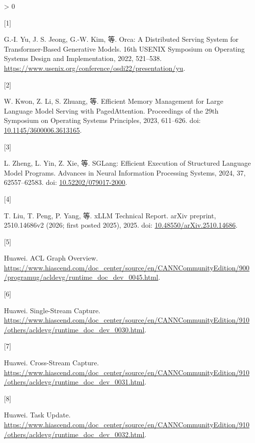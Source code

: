 \documentclass[
  UTF8,
  zihao=5]{ctexart}
\newlength{\cslhangindent}
\newlength{\csllabelwidth}
\newenvironment{CSLReferences}[2] %
 {%
  \setlength{\parindent}{0pt}
  \ifodd #1 \everypar{\setlength{\hangindent}{\cslhangindent}}\ignorespaces\fi
  \ifnum #2 > 0
  \setlength{\parskip}{#2\baselineskip}
  \fi
 }%
 {}
\newcommand{\CSLLeftMargin}[1]{\parbox[t]{\csllabelwidth}{#1}}
\newcommand{\CSLRightInline}[1]{\parbox[t]{\linewidth - \csllabelwidth}{#1}\par}
\begin{document}
\hypertarget{refs}{}
\begin{CSLReferences}{0}{0}
\leavevmode{}%
\CSLLeftMargin{{[}1{]} }%
\CSLRightInline{G.-I. Yu, J. S. Jeong, G.-W. Kim, 等. {Orca: A
Distributed Serving System for Transformer-Based Generative Models}.
16th USENIX Symposium on Operating Systems Design and Implementation,
2022, 521--538.
\url{https://www.usenix.org/conference/osdi22/presentation/yu}.}

\leavevmode{}%
\CSLLeftMargin{{[}2{]} }%
\CSLRightInline{W. Kwon, Z. Li, S. Zhuang, 等. {Efficient Memory
Management for Large Language Model Serving with PagedAttention}.
Proceedings of the 29th Symposium on Operating Systems Principles, 2023,
611--626. doi:
\href{https://doi.org/10.1145/3600006.3613165}{10.1145/3600006.3613165}.}

\leavevmode{}%
\CSLLeftMargin{{[}3{]} }%
\CSLRightInline{L. Zheng, L. Yin, Z. Xie, 等. {SGLang: Efficient
Execution of Structured Language Model Programs}. Advances in Neural
Information Processing Systems, 2024, 37, 62557--62583. doi:
\href{https://doi.org/10.52202/079017-2000}{10.52202/079017-2000}.}

\leavevmode{}%
\CSLLeftMargin{{[}4{]} }%
\CSLRightInline{T. Liu, T. Peng, P. Yang, 等. {xLLM Technical Report}.
arXiv preprint, 2510.14686v2 (2026; first posted 2025), 2025. doi:
\href{https://doi.org/10.48550/arXiv.2510.14686}{10.48550/arXiv.2510.14686}.}

\leavevmode{}%
\CSLLeftMargin{{[}5{]} }%
\CSLRightInline{Huawei. {ACL Graph Overview}.
\url{https://www.hiascend.com/doc_center/source/en/CANNCommunityEdition/900/programug/acldevg/runtime_doc_dev_0045.html}.}

\leavevmode{}%
\CSLLeftMargin{{[}6{]} }%
\CSLRightInline{Huawei. {Single-Stream Capture}.
\url{https://www.hiascend.com/doc_center/source/en/CANNCommunityEdition/910/others/acldevg/runtime_doc_dev_0030.html}.}

\leavevmode{}%
\CSLLeftMargin{{[}7{]} }%
\CSLRightInline{Huawei. {Cross-Stream Capture}.
\url{https://www.hiascend.com/doc_center/source/en/CANNCommunityEdition/910/others/acldevg/runtime_doc_dev_0031.html}.}

\leavevmode{}%
\CSLLeftMargin{{[}8{]} }%
\CSLRightInline{Huawei. {Task Update}.
\url{https://www.hiascend.com/doc_center/source/en/CANNCommunityEdition/910/others/acldevg/runtime_doc_dev_0032.html}.}


\end{CSLReferences}
\end{document}
